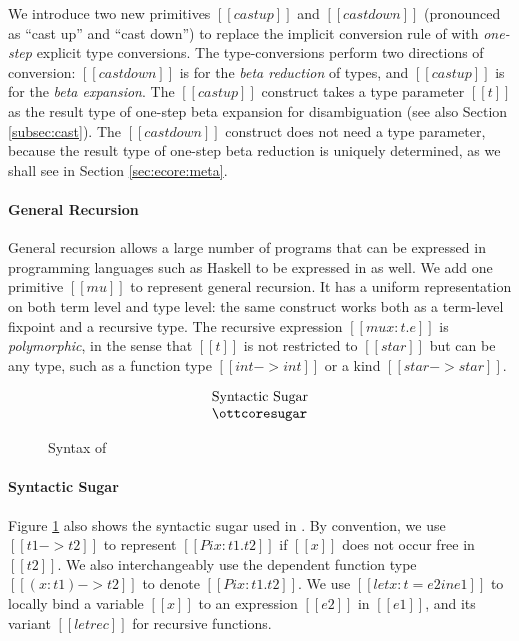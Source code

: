 We introduce two new primitives $[[castup]]$ and $[[castdown]]$
(pronounced as ``cast up'' and ``cast down'') to replace the implicit
conversion rule of \cc with \emph{one-step} explicit type
conversions. The type-conversions perform two directions of conversion:
$[[castdown]]$ is for the \emph{beta reduction} of types, and
$[[castup]]$ is for the \emph{beta expansion}. The $[[castup]]$
construct takes a
type parameter $[[t]]$ as the result type of one-step beta expansion
for disambiguation (see also Section \ref{subsec:cast}). The $[[castdown]]$ construct
does not need a type parameter,  because the result type of one-step beta reduction
is uniquely determined, as we shall see in Section \ref{sec:ecore:meta}.

\paragraph{General Recursion}
General recursion allows a large number of programs that can be expressed in programming languages such 
as Haskell to be expressed in \name as well.
We add one primitive $[[mu]]$ to represent general recursion.
It has a uniform representation on both term level and type level: the
same construct works both as a term-level fixpoint and a recursive type. The recursive
expression $[[mu x:t.e]]$ is \emph{polymorphic}, in the sense that $[[t]]$ 
is not restricted to $[[star]]$ but can be any type, 
such as a function type $[[int -> int]]$ or a kind $[[star -> star]]$.

\begin{figure}[t]
\centering
\footnotesize
\begin{spacing}{0.9}
    \gram{\otte\ottinterrule
        \ottG\ottinterrule
        \ottv}
    \[
    \begin{array}{l}
    \text{Syntactic Sugar} \\
    \ottcoresugar \end{array}\]
\end{spacing}
    \caption{Syntax of \name}
    \label{fig:ecore:syntax}
\end{figure}

\paragraph{Syntactic Sugar}
Figure \ref{fig:ecore:syntax} also shows the syntactic sugar used in \name.
By convention, we use $[[t1 -> t2]]$ to represent 
$[[Pi x:t1.t2]]$ if $[[x]]$ does not occur free in $[[t2]]$. 
We also interchangeably use the dependent function type $[[(x:t1) -> t2]]$
to denote $[[Pi x:t1.t2]]$.
We use $[[let x:t=e2 in e1]]$ to locally bind a variable $[[x]]$ to 
an expression $[[e2]]$ in $[[e1]]$, and its variant $[[letrec]]$ for
recursive functions.

